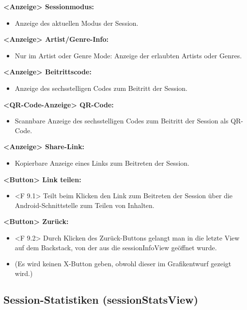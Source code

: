 \documentclass[oneside, ngerman]{sdqtechreport}
\begin{document}
\textbf{<Anzeige> Sessionmodus:}
\begin{itemize}
    \item Anzeige des aktuellen Modus der Session.
\end{itemize}

\textbf{<Anzeige> Artist/Genre-Info:}
\begin{itemize}
    \item Nur im Artist oder Genre Mode: Anzeige der erlaubten Artists oder Genres.
\end{itemize}

\textbf{<Anzeige> Beitrittscode:}
\begin{itemize}
    \item Anzeige des sechsstelligen Codes zum Beitritt der Session.
\end{itemize}

\textbf{<QR-Code-Anzeige> QR-Code:}
\begin{itemize}
    \item Scannbare Anzeige des sechsstelligen Codes zum Beitritt der Session als QR-Code.
\end{itemize}

\textbf{<Anzeige> Share-Link:}
\begin{itemize}
    \item Kopierbare Anzeige eines Links zum Beitreten der Session.
\end{itemize}

\textbf{<Button> Link teilen:}
\begin{itemize}
    \item <F 9.1> Teilt beim Klicken den Link zum Beitreten der Session über die Android-Schnittstelle zum Teilen von Inhalten.
\end{itemize}

\textbf{<Button> Zurück:}
\begin{itemize}
    \hypertarget{<F 9.2>}{}
    \item <F 9.2> Durch Klicken des Zurück-Buttons gelangt man in die letzte View auf dem Backstack, von der aus die sessionInfoView geöffnet wurde.
    \item (Es wird keinen X-Button geben, obwohl dieser im Grafikentwurf gezeigt wird.)
\end{itemize}


\subsection{Session-Statistiken (sessionStatsView)}
\label{sec:Benutzeroberfläche:sessionStatsView}
\end{document}
